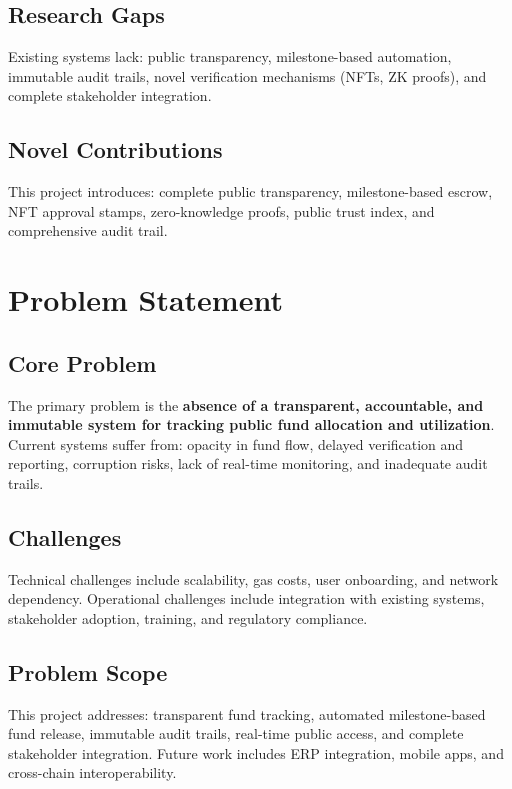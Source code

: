 \documentclass[12pt,a4wide]{report}
\theoremstyle{plain}
\theoremstyle{definition}
\theoremstyle{remark}
\begin{document}
\section{Research Gaps}

Existing systems lack: public transparency, milestone-based automation, immutable audit trails, novel verification mechanisms (NFTs, ZK proofs), and complete stakeholder integration.

\section{Novel Contributions}

This project introduces: complete public transparency, milestone-based escrow, NFT approval stamps, zero-knowledge proofs, public trust index, and comprehensive audit trail.

\chapter{Problem Statement}

\section{Core Problem}

The primary problem is the \textbf{absence of a transparent, accountable, and immutable system for tracking public fund allocation and utilization}. Current systems suffer from: opacity in fund flow, delayed verification and reporting, corruption risks, lack of real-time monitoring, and inadequate audit trails.

\section{Challenges}

Technical challenges include scalability, gas costs, user onboarding, and network dependency. Operational challenges include integration with existing systems, stakeholder adoption, training, and regulatory compliance.

\section{Problem Scope}

This project addresses: transparent fund tracking, automated milestone-based fund release, immutable audit trails, real-time public access, and complete stakeholder integration. Future work includes ERP integration, mobile apps, and cross-chain interoperability.
\end{document}
